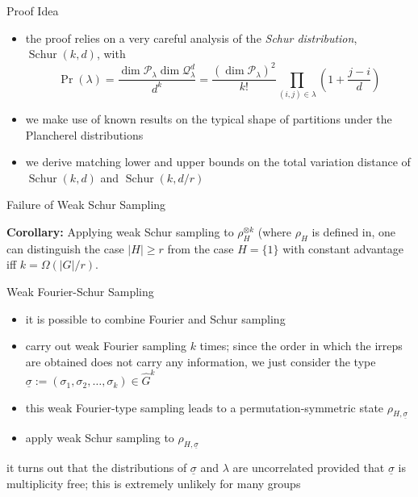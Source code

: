 \documentclass[slideColor]{prosper}
\newcommand{\cP}{{\mathcal{P}}}
\newcommand{\cQ}{{\mathcal{Q}}}
\newcommand{\schur}{\mathop{\mathrm{Schur}}}
\renewcommand{\>}{\rangle}
\newcommand{\<}{\langle}
\newcommand{\ot}{\otimes}
\begin{document}

\begin{slide}{Proof Idea}
\begin{itemize}
\item the proof relies on a very careful analysis of the {\em Schur distribution}, $\schur(k,d)$, with
\[
  \Pr(\lambda) = \frac{\dim \cP_\lambda \dim \cQ_\lambda^d}{d^k} 
               = \frac{(\dim \cP_\lambda)^2}{k!}
                  \prod_{(i,j) \in \lambda} \! \left(1 + \frac{j-i}{d}\right)
\]
\item we make use of known results on the typical shape of partitions under the Plancherel distributions 
\item we derive matching lower and upper bounds on the total variation distance of $\schur(k,d)$ and $\schur(k,d/r)$
\end{itemize}
\end{slide}


\begin{slide}{Failure of Weak Schur Sampling}

{\bf Corollary:} Applying weak Schur sampling to $\rho_H^{\ot k}$ (where $\rho_H$ is defined in, one can distinguish the case $|H|\geq r$ from the case $H=\{1\}$ with constant advantage iff $k=\Omega(|G|/r)$.

\end{slide}


\begin{slide}{Weak Fourier-Schur Sampling}
\begin{itemize}
\item it is possible to combine Fourier and Schur sampling
\item carry out weak Fourier sampling $k$ times; since the order in which the irreps are obtained does not carry any information, we just consider the type $\underline{\sigma}:=(\sigma_1,\sigma_2,\ldots,\sigma_k) \in \hat G^k$
\item this weak Fourier-type sampling leads to a permutation-symmetric state $\rho_{H,\underline{\sigma}}$
\item apply weak Schur sampling to $\rho_{H,\underline{\sigma}}$
\end{itemize}
it turns out that the distributions of $\underline{\sigma}$ and $\lambda$ are uncorrelated provided that $\underline{\sigma}$ is multiplicity free; this is extremely unlikely for many groups
\end{slide}
\end{document}
